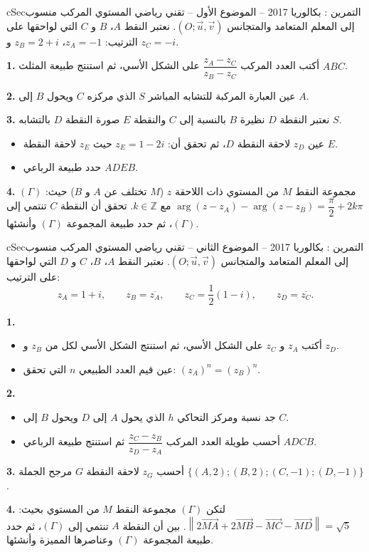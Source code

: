 \documentclass[12pt,a4paper]{article}
\newenvironment{BOX}[2]{\begin{otherlanguage}{english}\begin{arbox}{#1}{#2}}{\end{arbox}\end{otherlanguage}}
\newcounter{exo}
\newenvironment{tamrin}[1]{\stepcounter{exo}\begin{BOX}{cSec}{التمرين \theexo: #1}}{\end{BOX}}
\newenvironment{sq}{\begin{itemize}[leftmargin=2.4em,itemsep=3pt]}{\end{itemize}}
\newcommand{\qa}{\item[(أ)]}\newcommand{\qb}{\item[(ب)]}\newcommand{\qc}{\item[(جـ)]}\newcommand{\qd}{\item[(د)]}\newcommand{\qe}{\item[(هـ)]}
\newcommand{\QQ}[1]{\par\smallskip\textbf{#1.} }
\begin{document}
\begin{tamrin}{بكالوريا 2017 -- الموضوع الأول -- تقني رياضي}
المستوي المركب منسوب إلى المعلم المتعامد والمتجانس $(O;\vec u,\vec v)$. نعتبر النقط $A$، $B$ و $C$ التي لواحقها على الترتيب: $z_A=-1$، $z_B=2+i$ و $z_C=-i$.

\QQ{1} أكتب العدد المركب $\dfrac{z_A-z_C}{z_B-z_C}$ على الشكل الأسي، ثم استنتج طبيعة المثلث $ABC$.

\QQ{2} عين العبارة المركبة للتشابه المباشر $S$ الذي مركزه $C$ ويحول $B$ إلى $A$.

\QQ{3} نعتبر النقطة $D$ نظيرة $B$ بالنسبة إلى $C$ والنقطة $E$ صورة النقطة $D$ بالتشابه $S$.
\begin{sq}
\qa عين $z_D$ لاحقة النقطة $D$، ثم تحقق أن: $z_E=1-2i$ حيث $z_E$ لاحقة النقطة $E$.
\qb حدد طبيعة الرباعي $ADEB$.
\end{sq}
\QQ{4} $(\Gamma)$ مجموعة النقط $M$ من المستوي ذات اللاحقة $z$ ($M$ تختلف عن $A$ و $B$) حيث:
$\arg(z-z_A)-\arg(z-z_B)=\dfrac{\pi}{2}+2k\pi$ مع $k\in\mathbb{Z}$.
تحقق أن النقطة $C$ تنتمي إلى $(\Gamma)$، ثم حدد طبيعة المجموعة $(\Gamma)$ وأنشئها.
\end{tamrin}

\begin{tamrin}{بكالوريا 2017 -- الموضوع الثاني -- تقني رياضي}
المستوي المركب منسوب إلى المعلم المتعامد والمتجانس $(O;\vec u,\vec v)$. نعتبر النقط $A$، $B$، $C$ و $D$ التي لواحقها على الترتيب:
\[z_A=1+i,\qquad z_B=\overline{z_A},\qquad z_C=\frac12(1-i),\qquad z_D=\overline{z_C}.\]
\QQ{1}
\begin{sq}
\qa أكتب $z_A$ و $z_C$ على الشكل الأسي، ثم استنتج الشكل الأسي لكل من $z_B$ و $z_D$.
\qb عين قيم العدد الطبيعي $n$ التي تحقق: $(z_A)^n=(z_B)^n$.
\end{sq}
\QQ{2}
\begin{sq}
\qa جد نسبة ومركز التحاكي $h$ الذي يحول $A$ إلى $D$ ويحول $B$ إلى $C$.
\qb أحسب طويلة العدد المركب $\dfrac{z_C-z_B}{z_D-z_A}$ ثم استنتج طبيعة الرباعي $ADCB$.
\end{sq}
\QQ{3} أحسب $z_G$ لاحقة النقطة $G$ مرجح الجملة $\{(A,2);(B,2);(C,-1);(D,-1)\}$.

\QQ{4} لتكن $(\Gamma)$ مجموعة النقط $M$ من المستوي بحيث: $\left\|2\overrightarrow{MA}+2\overrightarrow{MB}-\overrightarrow{MC}-\overrightarrow{MD}\right\|=\sqrt5$.
بين أن النقطة $A$ تنتمي إلى $(\Gamma)$، ثم حدد طبيعة المجموعة $(\Gamma)$ وعناصرها المميزة وأنشئها.
\end{tamrin}
\end{document}
